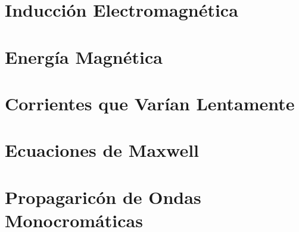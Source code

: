 \chapter{Inducción Electromagnética}














\chapter{Energía Magnética}













\chapter{Corrientes que Varían Lentamente}















\chapter{Ecuaciones de Maxwell}














\chapter{Propagaricón de Ondas Monocromáticas}











































